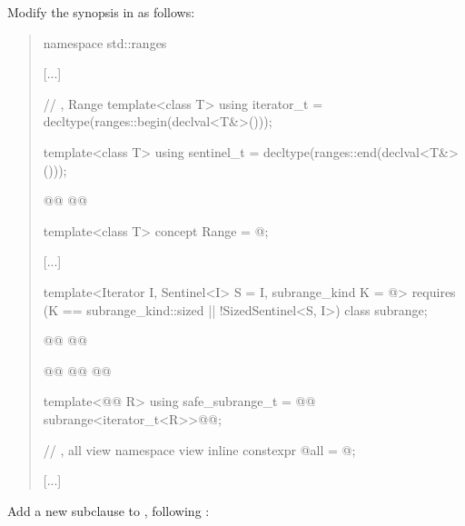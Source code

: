 Modify the  synopsis in  as follows:
\begin{quote}
\begin{codeblock}
namespace std::ranges {
  [...]

  // , Range
  template<class T>
    using iterator_t = decltype(ranges::begin(declval<T&>()));

  template<class T>
    using sentinel_t = decltype(ranges::end(declval<T&>()));

  @@
    @@

  template<class T>
    concept Range = @\seebelownc@;

  [...]

  template<Iterator I, Sentinel<I> S = I, subrange_kind K = @\seebelownc@>
    requires (K == subrange_kind::sized || !SizedSentinel<S, I>)
  class subrange;

  @@
  @@

  @@
    @@
      @@

  template<@@ R>
    using safe_subrange_t =
      @@ subrange<iterator_t<R>>@@;

  // , all view
  namespace view { inline constexpr @\unspec@ all = @\unspecnc@; }

  [...]
}
\end{codeblock}
\end{quote}

Add a new subclause to , following :

